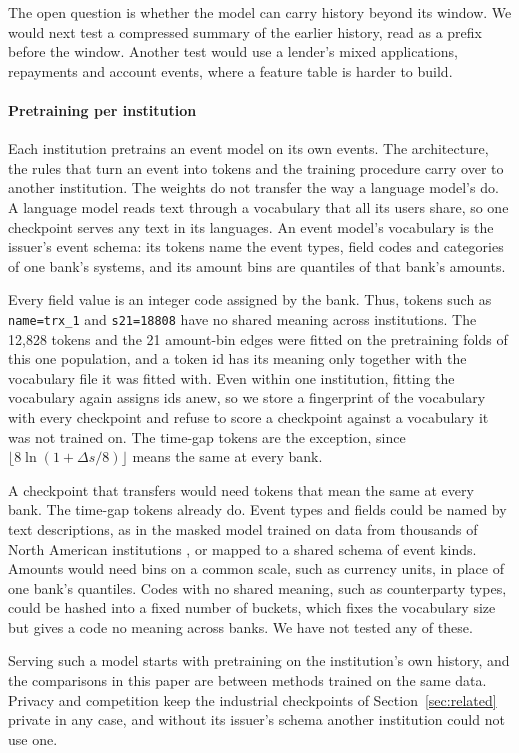 \documentclass[12pt]{article}
\newcommand{\tok}[1]{\texttt{#1}}
\begin{document}
The open question is whether the model can carry history beyond its window. We would next test a compressed summary of the earlier history, read as a prefix before the window. Another test would use a lender's mixed applications, repayments and account events, where a feature table is harder to build.

\paragraph{Pretraining per institution}\label{sec:per-institution} Each institution pretrains an event model on its own events. The architecture, the rules that turn an event into tokens and the training procedure carry over to another institution. The weights do not transfer the way a language model's do. A language model reads text through a vocabulary that all its users share, so one checkpoint serves any text in its languages. An event model's vocabulary is the issuer's event schema: its tokens name the event types, field codes and categories of one bank's systems, and its amount bins are quantiles of that bank's amounts.

Every field value is an integer code assigned by the bank. Thus, tokens such as \tok{name=trx\_1} and \tok{s21=18808} have no shared meaning across institutions. The 12,828 tokens and the 21 amount-bin edges were fitted on the pretraining folds of this one population, and a token id has its meaning only together with the vocabulary file it was fitted with. Even within one institution, fitting the vocabulary again assigns ids anew, so we store a fingerprint of the vocabulary with every checkpoint and refuse to score a checkpoint against a vocabulary it was not trained on. The time-gap tokens are the exception, since $\lfloor 8\ln(1 + \Delta s/8) \rfloor$ means the same at every bank.

A checkpoint that transfers would need tokens that mean the same at every bank. The time-gap tokens already do. Event types and fields could be named by text descriptions, as in the masked model trained on data from thousands of North American institutions \cite{openbanking}, or mapped to a shared schema of event kinds. Amounts would need bins on a common scale, such as currency units, in place of one bank's quantiles. Codes with no shared meaning, such as counterparty types, could be hashed into a fixed number of buckets, which fixes the vocabulary size but gives a code no meaning across banks. We have not tested any of these.

Serving such a model starts with pretraining on the institution's own history, and the comparisons in this paper are between methods trained on the same data. Privacy and competition keep the industrial checkpoints of Section~\ref{sec:related} private in any case, and without its issuer's schema another institution could not use one.
\end{document}
